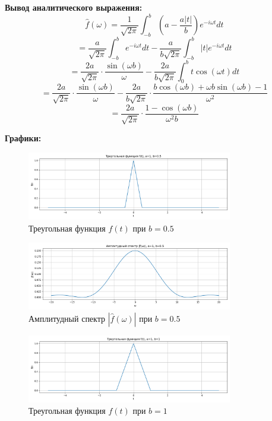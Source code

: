 \textbf{Вывод аналитического выражения:}
\[
\hat{f}(\omega) = \frac{1}{\sqrt{2\pi}} \int_{-b}^{b} \left(a - \frac{a |t|}{b}\right) e^{-i \omega t} dt
\]
\[
= \frac{a}{\sqrt{2\pi}} \int_{-b}^{b} e^{-i \omega t} dt - \frac{a}{b\sqrt{2\pi}} \int_{-b}^{b} |t| e^{-i \omega t} dt
\]
\[
= \frac{2a}{\sqrt{2\pi}} \cdot \frac{\sin(\omega b)}{\omega} - \frac{2a}{b\sqrt{2\pi}} \int_{0}^{b} t \cos(\omega t) dt
\]
\[
= \frac{2a}{\sqrt{2\pi}} \cdot \frac{\sin(\omega b)}{\omega} - \frac{2a}{b\sqrt{2\pi}} \cdot \frac{b \cos(\omega b) + \omega b \sin(\omega b) - 1}{\omega^2}
\]
\[
= \frac{2a}{\sqrt{2\pi}} \cdot \frac{1 - \cos(\omega b)}{\omega^2 b}
\]

\textbf{Графики:}

\begin{figure}[H]
    \centering
    \includegraphics[width=0.8\textwidth]{triangle_function_b0.5.png}
    \caption{Треугольная функция $f(t)$ при $b = 0.5$}
\end{figure}

\begin{figure}[H]
    \centering
    \includegraphics[width=0.8\textwidth]{triangle_spectrum_b0.5.png}
    \caption{Амплитудный спектр $|\hat{f}(\omega)|$ при $b = 0.5$}
\end{figure}

\begin{figure}[H]
    \centering
    \includegraphics[width=0.8\textwidth]{triangle_function_b1.png}
    \caption{Треугольная функция $f(t)$ при $b = 1$}
\end{figure}

